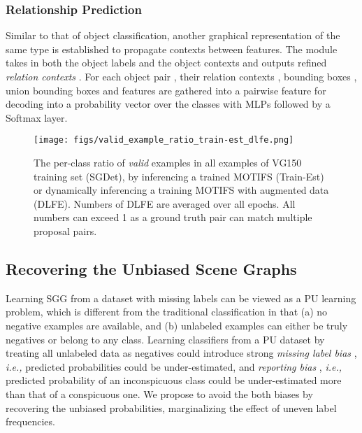 \documentclass[sigconf]{acmart}
\begin{document}
\subsubsection{Relationship Prediction }
Similar to that of object classification, another graphical representation of the same type is established to propagate contexts between features.
The module takes in both the object labels  and the object contexts  and outputs refined \textit{relation contexts} .
For each object pair , their relation contexts , bounding boxes , union bounding boxes  and features  are gathered into a pairwise feature  for decoding into a probability vector over the  classes with MLPs followed by a Softmax layer.

\begin{figure}[t!]
\begin{center}
\texttt{[image: figs/valid\_example\_ratio\_train-est\_dlfe.png]}
\end{center}
\vspace{-1.7em}
  \caption{
  The per-class ratio of \textit{valid} examples in all examples of VG150 training set \cite{xu2017scene} (SGDet), by inferencing a trained MOTIFS (Train-Est) or dynamically inferencing a training MOTIFS with augmented data (DLFE).
  Numbers of DLFE are averaged over all epochs.
  All numbers can exceed 1 as a ground truth pair can match multiple proposal pairs.
}
\label{fig:valid_example_ratio_train-est_dlfe}
\vspace{-1.2em}
\end{figure}

\subsection{Recovering the Unbiased Scene Graphs}
\label{sec:preliminary_on_pu_learning}
Learning SGG from a dataset with missing labels can be viewed as a PU learning problem, which is different from the traditional classification in that (a) no negative examples are available, and (b) unlabeled examples can either be truly negatives or belong to any class.
Learning classifiers from a PU dataset by treating all unlabeled data as negatives could introduce strong \textit{missing label bias} \cite{elkan2008learning}, \emph{i.e.,} predicted probabilities could be under-estimated, and \textit{reporting bias} \cite{misra2016seeing}, \emph{i.e.,} predicted probability of an inconspicuous class could be under-estimated more than that of a conspicuous one.
We propose to avoid the both biases by recovering the unbiased probabilities, marginalizing the effect of uneven label frequencies.
\end{document}
